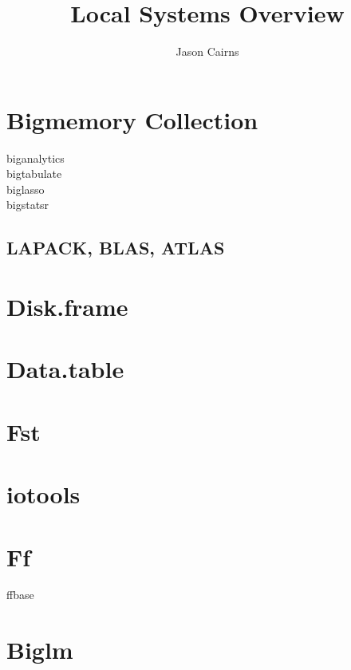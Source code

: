 \documentclass[10pt,a4paper]{article}
\begin{document}
\title{Local Systems Overview}
\author{Jason Cairns}
\maketitle{}

\section{Bigmemory Collection}
\label{sec:bigmemory-collection}

\begin{description}
\item[biganalytics] 
\item[bigtabulate] 
\item[biglasso] 
\item[bigstatsr] 
\end{description}

\subsection{LAPACK, BLAS, ATLAS}
\label{sec:blas-lapack}

\section{Disk.frame}
\label{sec:disk.frame}

\section{Data.table}
\label{sec:data.table}

\section{Fst}
\label{sec:fst}

\section{iotools}
\label{sec:iotools}

\section{Ff}
\label{sec:ff}

\begin{description}
\item[ffbase] 
\end{description}

\section{Biglm}
\label{sec:biglm}
\end{document}
